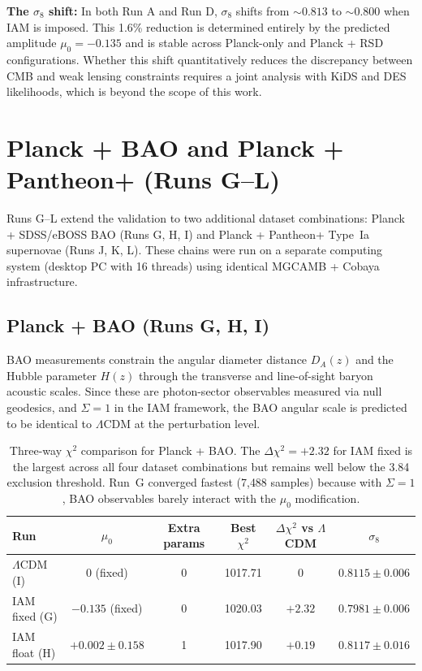 \documentclass[11pt,letterpaper]{article}
\begin{document}
\textbf{The $\sigma_8$ shift:} In both Run A and Run D, $\sigma_8$ shifts from $\sim 0.813$ to $\sim 0.800$ when IAM is imposed. This 1.6\% reduction is determined entirely by the predicted amplitude $\mu_0 = -0.135$ and is stable across Planck-only and Planck + RSD configurations. Whether this shift quantitatively reduces the discrepancy between CMB and weak lensing constraints requires a joint analysis with KiDS and DES likelihoods, which is beyond the scope of this work.

\section{Planck + BAO and Planck + Pantheon+ (Runs G--L)}
\label{sec:planck_bao_pantheon}

Runs G--L extend the validation to two additional dataset combinations: Planck + SDSS/eBOSS BAO (Runs G, H, I) and Planck + Pantheon+ Type~Ia supernovae (Runs J, K, L). These chains were run on a separate computing system (desktop PC with 16 threads) using identical MGCAMB + Cobaya infrastructure.

\subsection{Planck + BAO (Runs G, H, I)}

BAO measurements constrain the angular diameter distance $D_A(z)$ and the Hubble parameter $H(z)$ through the transverse and line-of-sight baryon acoustic scales. Since these are photon-sector observables measured via null geodesics, and $\Sigma = 1$ in the IAM framework, the BAO angular scale is predicted to be identical to $\Lambda$CDM at the perturbation level.

\begin{table}[h]
\centering
\begin{tabular}{lccccc}
\toprule
Run & $\mu_0$ & Extra params & Best $\chi^2$ & $\Delta\chi^2$ vs $\Lambda$CDM & $\sigma_8$ \\
\midrule
$\Lambda$CDM (I) & 0 (fixed) & 0 & 1017.71 & 0 & $0.8115 \pm 0.006$ \\
IAM fixed (G) & $-0.135$ (fixed) & 0 & 1020.03 & $+2.32$ & $0.7981 \pm 0.006$ \\
IAM float (H) & $+0.002 \pm 0.158$ & 1 & 1017.90 & $+0.19$ & $0.8117 \pm 0.016$ \\
\bottomrule
\end{tabular}
\caption{Three-way $\chi^2$ comparison for Planck + BAO. The $\Delta\chi^2 = +2.32$ for IAM fixed is the largest across all four dataset combinations but remains well below the 3.84 exclusion threshold. Run~G converged fastest (7{,}488 samples) because with $\Sigma = 1$, BAO observables barely interact with the $\mu_0$ modification.}
\label{tab:comparison_bao}
\end{table}
\end{document}
